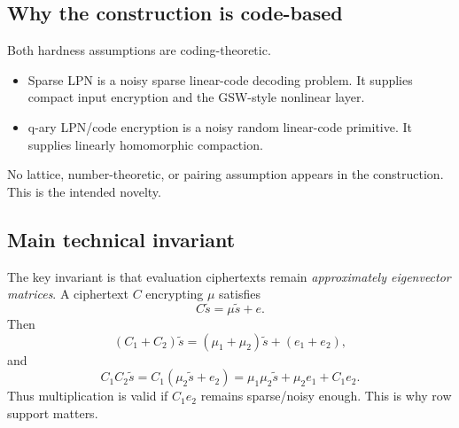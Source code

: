 \subsection{Why the construction is code-based}

Both hardness assumptions are coding-theoretic.
\begin{itemize}
    \item Sparse LPN is a noisy sparse linear-code decoding problem.  It supplies compact input encryption and the GSW-style nonlinear layer.
    \item q-ary LPN/code encryption is a noisy random linear-code primitive.  It supplies linearly homomorphic compaction.
\end{itemize}
No lattice, number-theoretic, or pairing assumption appears in the construction.  This is the intended novelty.

\subsection{Main technical invariant}

The key invariant is that evaluation ciphertexts remain \emph{approximately eigenvector matrices}.  A ciphertext $C$ encrypting $\mu$ satisfies
\[
    C\tilde{s}=\mu\tilde{s}+e.
\]
Then
\[
    (C_1+C_2)\tilde{s}=(\mu_1+\mu_2)\tilde{s}+(e_1+e_2),
\]
and
\[
    C_1C_2\tilde{s}
    =C_1(\mu_2\tilde{s}+e_2)
    =\mu_1\mu_2\tilde{s}+\mu_2e_1+C_1e_2.
\]
Thus multiplication is valid if $C_1e_2$ remains sparse/noisy enough.  This is why row support matters.
